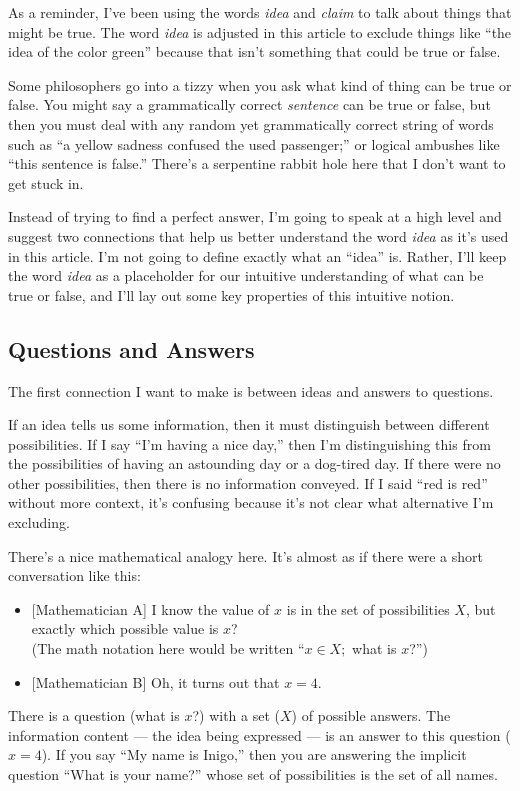 \documentclass[11pt, oneside]{article}
\theoremstyle{argtstyle}
\begin{document}
As a reminder,
I've been using the words {\em idea} and {\em claim} to talk
about things that might be true.
The word {\em idea} is adjusted in this article to exclude
things like ``the idea of the color green'' because that isn't something that
could be true or false.

Some philosophers go into a tizzy when you ask
what kind of thing can be true or false.
You might say a grammatically correct {\em sentence} can be true or false,
but then you must deal with any random yet grammatically correct string
of words such as
``a yellow sadness confused the used
passenger;'' or logical ambushes like ``this sentence is false.''
There's a serpentine rabbit hole here that I don't want to get stuck in.

Instead of trying to find a perfect answer, I'm going to speak at a high level
and suggest two connections that help us better understand the word {\em idea}
as it's used in this article.
I'm not going to define exactly what an ``idea'' is.
Rather, I'll keep the word {\em idea} as a placeholder for our
intuitive understanding of what can be true or false, and I'll lay out some key
properties of this intuitive notion.

\subsection{Questions and Answers}

The first connection I want to make is between ideas and answers to questions.

If an idea tells us some information, then it must distinguish between different
possibilities. If I say ``I'm having a nice day,'' then I'm distinguishing this
from the possibilities of having an astounding day or a dog-tired day.
If there were no other possibilities,
then there is no information conveyed. If I said
``red is red'' without more context,
it's confusing because it's not clear what
alternative I'm excluding.

There's a nice mathematical analogy here. It's almost as if there were a short
conversation like this:
\begin{itemize}
    \item{} [Mathematician A] I know the value of $x$ is in the set of
        possibilities $X$, but exactly which possible value is $x$?\\
        (The math notation here would be written ``$x\in X;$ what is $x$?'')
    \item{} [Mathematician B] Oh, it turns out that $x=4$.
\end{itemize}
There is a question (what is $x$?) with a set ($X$) of possible answers. The
information content --- the idea being expressed ---
is an answer to this question ($x=4$). If you say ``My name is Inigo,''
then you are answering the implicit question ``What is your name?'' whose set of
possibilities is the set of all names.
\end{document}
